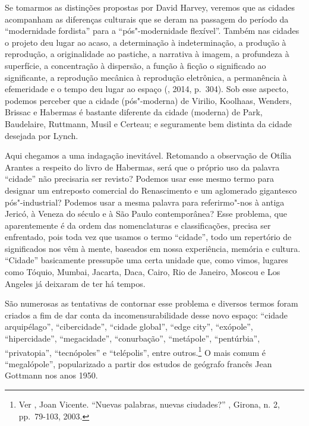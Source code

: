 Se tomarmos as distinções propostas por David Harvey, veremos que as
cidades acompanham as diferenças culturais que se deram na passagem do
período da ``modernidade fordista'' para a ``pós"-modernidade flexível''.
Também nas cidades o projeto deu lugar ao acaso, a determinação à
indeterminação, a produção à reprodução, a originalidade ao pastiche,
a narrativa à imagem, a profundeza à superfície,
a concentração à dispersão, a função à ficção o
significado ao significante, a reprodução mecânica à reprodução
eletrônica, a permanência à efemeridade e o tempo deu lugar ao espaço
(, 2014, p.~304). Sob esse aspecto, podemos perceber que a cidade
(pós"-moderna) de Virilio, Koolhaas, Wenders, Brissac e Habermas
é bastante diferente da cidade (moderna) de Park, Baudelaire, Ruttmann,
Musil e Certeau; e seguramente bem distinta da cidade desejada por
Lynch.

Aqui chegamos a uma indagação inevitável. Retomando a observação de
Otília Arantes a respeito do livro de Habermas, será que o próprio uso
da palavra ``cidade'' não precisaria ser revisto? Podemos usar esse
mesmo termo para designar um entreposto comercial do Renascimento e um
aglomerado gigantesco pós"-industrial? Podemos usar a mesma palavra para
referirmo"-nos à antiga Jericó, à Veneza do século  e à São Paulo
contemporânea? Esse problema, que aparentemente é da ordem das
nomenclaturas e classificações, precisa ser enfrentado, pois toda vez
que usamos o termo ``cidade'', todo um repertório de significados nos
vêm à mente, baseados em nossa experiência, memória e cultura.
``Cidade'' basicamente pressupõe uma certa unidade que, como vimos,
lugares como Tóquio, Mumbai, Jacarta, Daca, Cairo, Rio de Janeiro,
Moscou e Los Angeles já deixaram de ter há tempos.

São numerosas as tentativas de contornar esse problema e diversos termos
foram criados a fim de dar conta da incomensurabilidade desse novo
espaço: ``cidade arquipélago'', ``cibercidade'', ``cidade global'', ``edge
city'', ``exópole'', ``hipercidade'', ``megacidade'', ``conurbação'',
``metápole'', ``pentúrbia'', ``privatopia'', ``tecnópoles'' e
``telépolis'', entre outros.\footnote{Ver , Joan Vicente. ``Nuevas
  palabras, nuevas ciudades?'' {}, Girona, n.
  2, pp.~79-103, 2003.} O mais comum é ``megalópole'', popularizado a
partir dos estudos de geógrafo francês Jean Gottmann nos anos 1950.

